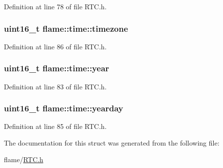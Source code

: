 Definition at line 78 of file R\-T\-C.\-h.

\hypertarget{structflame_1_1time_a4deaf87f9d7d63270bc9c7275fc3c4cb}{
\subsubsection[{timezone}]{\setlength{\rightskip}{0pt plus 5cm}uint16\-\_\-t flame\-::time\-::timezone}}\label{structflame_1_1time_a4deaf87f9d7d63270bc9c7275fc3c4cb}


Definition at line 86 of file R\-T\-C.\-h.

\hypertarget{structflame_1_1time_a74325344f17f185431c09e97a7208657}{
\subsubsection[{year}]{\setlength{\rightskip}{0pt plus 5cm}uint16\-\_\-t flame\-::time\-::year}}\label{structflame_1_1time_a74325344f17f185431c09e97a7208657}


Definition at line 83 of file R\-T\-C.\-h.

\hypertarget{structflame_1_1time_a17f380f3785ac47964ecb96657901155}{
\subsubsection[{yearday}]{\setlength{\rightskip}{0pt plus 5cm}uint16\-\_\-t flame\-::time\-::yearday}}\label{structflame_1_1time_a17f380f3785ac47964ecb96657901155}


Definition at line 85 of file R\-T\-C.\-h.



The documentation for this struct was generated from the following file\-:\begin{DoxyCompactItemize}
\item 
flame/\hyperlink{_r_t_c_8h}{R\-T\-C.\-h}\end{DoxyCompactItemize}
